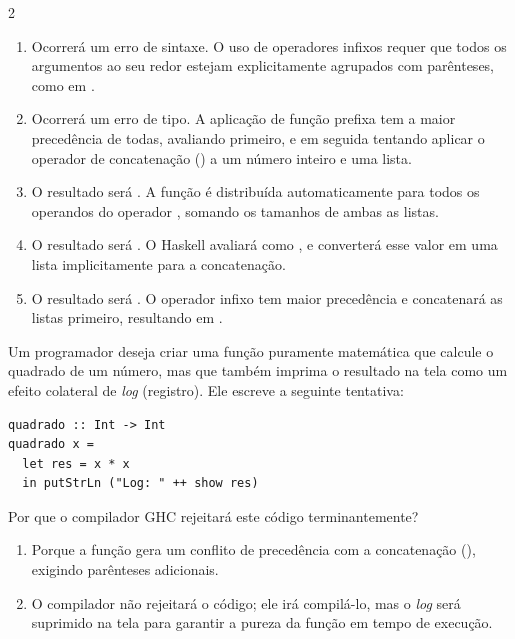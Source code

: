 \documentclass[a4paper,10pt,brazil]{article}
\begin{document}
\begin{multicols}{2}
\begin{enumerate}
  \item Ocorrerá um erro de sintaxe. O uso de operadores infixos requer que todos os argumentos ao seu redor estejam explicitamente agrupados com parênteses, como em .

  \item Ocorrerá um erro de tipo. A aplicação de função prefixa tem a maior precedência de todas, avaliando  primeiro, e em seguida tentando aplicar o operador de concatenação (\haskellinline{++}) a um número inteiro e uma lista.

  \item O resultado será . A função  é distribuída automaticamente para todos os operandos do operador \haskellinline{++}, somando os tamanhos de ambas as listas.

  \item O resultado será \haskellinline{[3, 4, 5]}. O Haskell avaliará  como , e converterá esse valor em uma lista implicitamente para a concatenação.

  \item O resultado será . O operador infixo \haskellinline{++} tem maior precedência e concatenará as listas primeiro, resultando em .


\end{enumerate}

Um programador deseja criar uma função puramente matemática que calcule o quadrado de um número, mas que também imprima o resultado na tela como um efeito colateral de \emph{log} (registro). Ele escreve a seguinte tentativa:

\begin{verbatim}
quadrado :: Int -> Int
quadrado x = 
  let res = x * x
  in putStrLn ("Log: " ++ show res)
\end{verbatim}

Por que o compilador GHC rejeitará este código terminantemente?

\begin{enumerate}
  \item Porque a função  gera um conflito de precedência com a concatenação (\haskellinline{++}), exigindo parênteses adicionais.

  \item O compilador não rejeitará o código; ele irá compilá-lo, mas o \emph{log} será suprimido na tela para garantir a pureza da função em tempo de execução.


\end{enumerate}
\end{multicols}
\end{document}
